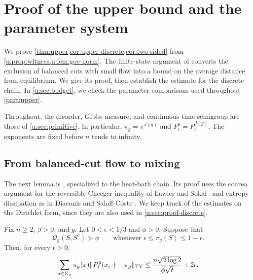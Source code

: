 \chapter{Proof of the upper bound and the parameter system}\label{u:sec:proof}

We prove \cref{thm:upper,cor:upper-discrete,cor:two-sided} from
\cref{u:prop:witness,u:lem:goe-norm}. The finite-state argument of
\cite[Section~7, Lemma~8]{oai-typical-upper} converts the exclusion of
balanced cuts with small flow into a bound on the average distance from
equilibrium. We give its proof, then establish the estimate for the
discrete chain. In \cref{u:sec:budget}, we check the parameter
comparisons used throughout \cref{part:upper}.

Throughout, the disorder, Gibbs measure, and continuous-time semigroup
are those of \cref{u:sec:primitive}. In particular,
$\pi_g=\pi^{J(g)}$ and $P_t^g=P_t^{J(g)}$. The exponents are fixed before
$n$ tends to infinity.

\section{From balanced-cut flow to mixing}\label{u:sec:pruning}

The next lemma is \cite[Lemma~8]{oai-typical-upper}, specialized to the
heat-bath chain. Its proof uses the coarea argument for the reversible
Cheeger inequality of Lawler and Sokal~\cite[Theorem~3.5]{lawler-sokal-1988} and
entropy dissipation as in Diaconis and Saloff-Coste
\cite[Lemmas~2.5 and~2.7]{diaconis-saloff-coste-1996}. We keep track of the estimates on
the Dirichlet form, since they are also used in
\cref{u:sec:proof-discrete}.

\begin{lemma}\label{u:lem:pruning}
Fix $n\ge2$, $\beta>0$, and $g$. Let $0<\epsilon<1/3$ and $\phi>0$.
Suppose that
\[
 \mathcal Q_g(S,S^c)>\phi
 \qquad\text{whenever }\epsilon\le\pi_g(S)\le1-\epsilon.
\]
Then, for every $t>0$,
\begin{equation}\label{u:eq:averaged-mixing}
 \sum_{x\in\Sigma_n}\pi_g(x)
       \lVert P_t^g(x,\cdot)-\pi_g\rVert_{\mathrm{TV}}
 \le\frac{n\sqrt{2\log2}}{\phi\sqrt t}+2\epsilon.
\end{equation}
\end{lemma}


